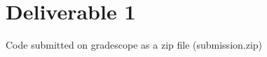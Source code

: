 
\section{Deliverable 1}

\begin{solve}    
Code submitted on gradescope as a zip file (submission.zip)
\end{solve}